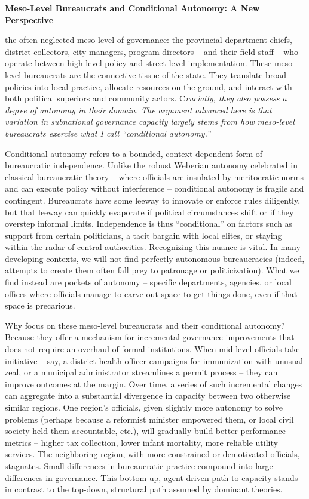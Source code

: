 \textbf{Meso-Level Bureaucrats and Conditional Autonomy: A New
Perspective}

the often-neglected meso-level of governance: the provincial department chiefs, district collectors, city
managers, program directors – and their field staff – who operate between high-level policy and street
level implementation. These meso-level bureaucrats are the connective tissue of the state. They translate
broad policies into local practice, allocate resources on the ground, and interact with both political
superiors and community actors. C\textit{rucially, they also possess a degree of autonomy in their domain. The
argument advanced here is that variation in subnational governance capacity largely stems from how
meso-level bureaucrats exercise what I call “conditional autonomy.”}


Conditional autonomy refers to a bounded, context-dependent form of bureaucratic independence.
Unlike the robust Weberian autonomy celebrated in classical bureaucratic theory – where officials are
insulated by meritocratic norms and can execute policy without interference – conditional autonomy is
fragile and contingent. Bureaucrats have some leeway to innovate or enforce rules diligently, but that
leeway can quickly evaporate if political circumstances shift or if they overstep informal limits.
Independence is thus “conditional” on factors such as support from certain politicians, a tacit bargain
with local elites, or staying within the radar of central authorities. Recognizing this nuance is vital. In
many developing contexts, we will not find perfectly autonomous bureaucracies (indeed, attempts to
create them often fall prey to patronage or politicization). What we find instead are pockets of autonomy
– specific departments, agencies, or local offices where officials manage to carve out space to get things
done, even if that space is precarious.

Why focus on these meso-level bureaucrats and their conditional autonomy? Because they offer a
mechanism for incremental governance improvements that does not require an overhaul of formal
institutions. When mid-level officials take initiative – say, a district health officer campaigns for
immunization with unusual zeal, or a municipal administrator streamlines a permit process – they can
improve outcomes at the margin. Over time, a series of such incremental changes can aggregate into a
substantial divergence in capacity between two otherwise similar regions. One region’s officials, given
slightly more autonomy to solve problems (perhaps because a reformist minister empowered them, or
local civil society held them accountable, etc.), will gradually build better performance metrics – higher
tax collection, lower infant mortality, more reliable utility services. The neighboring region, with more
constrained or demotivated officials, stagnates. Small differences in bureaucratic practice compound
into large differences in governance. This bottom-up, agent-driven path to capacity stands in contrast to
the top-down, structural path assumed by dominant theories.

